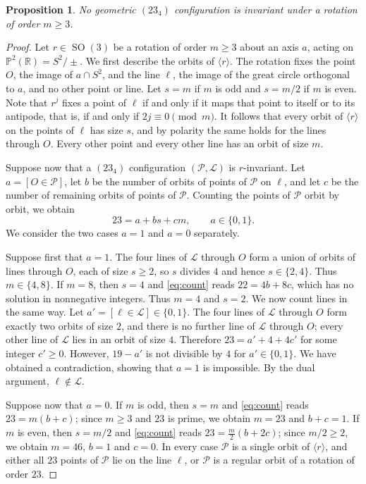 \documentclass[11pt]{article}
\theoremstyle{plain}
\newtheorem{proposition}[theorem]{Proposition}
\theoremstyle{definition}
\newcommand{\RR}{\mathbb{R}}
\newcommand{\PP}{\mathbb{P}}
\newcommand{\cP}{\mathcal{P}}
\newcommand{\cL}{\mathcal{L}}
\newcommand{\SO}{\operatorname{SO}}
\begin{document}
\begin{proposition}\label{prop:norotation}
No geometric $(23_4)$ configuration is invariant under a rotation of order $m\ge3$.
\end{proposition}

\begin{proof}
Let $r\in\SO(3)$ be a rotation of order $m\ge3$ about an axis $a$, acting on $\PP^2(\RR)=S^2/\pm$.  We first describe the orbits of $\langle r\rangle$.  The rotation fixes the point $O$, the image of $a\cap S^2$, and the line $\ell$, the image of the great circle orthogonal to $a$, and no other point or line.  Let $s=m$ if $m$ is odd and $s=m/2$ if $m$ is even.  Note that $r^j$ fixes a point of $\ell$ if and only if it maps that point to itself or to its antipode, that is, if and only if $2j\equiv0\pmod m$.  It follows that every orbit of $\langle r\rangle$ on the points of $\ell$ has size $s$, and by polarity the same holds for the lines through $O$.  Every other point and every other line has an orbit of size $m$.

Suppose now that a $(23_4)$ configuration $(\cP,\cL)$ is $r$-invariant.  Let $a=[O\in\cP]$, let $b$ be the number of orbits of points of $\cP$ on $\ell$, and let $c$ be the number of remaining orbits of points of $\cP$.  Counting the points of $\cP$ orbit by orbit, we obtain
\begin{equation}\label{eq:count}
23=a+bs+cm,\qquad a\in\{0,1\}.
\end{equation}
We consider the two cases $a=1$ and $a=0$ separately.

Suppose first that $a=1$.  The four lines of $\cL$ through $O$ form a union of orbits of lines through $O$, each of size $s\ge2$, so $s$ divides $4$ and hence $s\in\{2,4\}$.  Thus $m\in\{4,8\}$.  If $m=8$, then $s=4$ and \eqref{eq:count} reads $22=4b+8c$, which has no solution in nonnegative integers.  Thus $m=4$ and $s=2$.  We now count lines in the same way.  Let $a'=[\ell\in\cL]\in\{0,1\}$.  The four lines of $\cL$ through $O$ form exactly two orbits of size $2$, and there is no further line of $\cL$ through $O$; every other line of $\cL$ lies in an orbit of size $4$.  Therefore $23=a'+4+4c'$ for some integer $c'\ge0$.  However, $19-a'$ is not divisible by $4$ for $a'\in\{0,1\}$.  We have obtained a contradiction, showing that $a=1$ is impossible.  By the dual argument, $\ell\notin\cL$.

Suppose now that $a=0$.  If $m$ is odd, then $s=m$ and \eqref{eq:count} reads $23=m(b+c)$; since $m\ge3$ and $23$ is prime, we obtain $m=23$ and $b+c=1$.  If $m$ is even, then $s=m/2$ and \eqref{eq:count} reads $23=\frac m2(b+2c)$; since $m/2\ge2$, we obtain $m=46$, $b=1$ and $c=0$.  In every case $\cP$ is a single orbit of $\langle r\rangle$, and either all $23$ points of $\cP$ lie on the line $\ell$, or $\cP$ is a regular orbit of a rotation of order $23$.


\end{proof}
\end{document}

